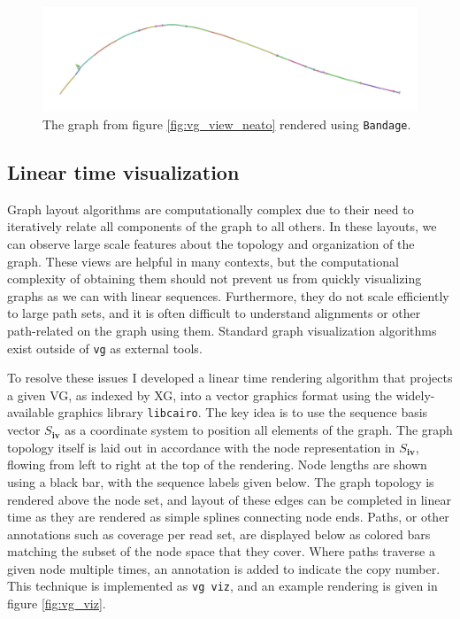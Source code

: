 \begin{figure}[htbp!] 
\centering    
\includegraphics[width=1.0\textwidth]{Chapter2/Figs/Vector/vg_view_H-3136_Bandage.pdf}
\caption[Force-directed layout with Bandage]{The graph from figure \ref{fig:vg_view_neato} rendered using {\tt Bandage}.}
\label{fig:vg_view_bandage}
\end{figure}

\subsection{Linear time visualization}

Graph layout algorithms are computationally complex due to their need to iteratively relate all components of the graph to all others.
In these layouts, we can observe large scale features about the topology and organization of the graph.
These views are helpful in many contexts, but the computational complexity of obtaining them should not prevent us from quickly visualizing graphs as we can with linear sequences.
Furthermore, they do not scale efficiently to large path sets, and it is often difficult to understand alignments or other path-related on the graph using them.
Standard graph visualization algorithms exist outside of {\tt vg} as external tools.

To resolve these issues I developed a linear time rendering algorithm that projects a given VG, as indexed by XG, into a vector graphics format using the widely-available graphics library {\tt libcairo}.
The key idea is to use the sequence basis vector $S_\textbf{iv}$ as a coordinate system to position all elements of the graph.
The graph topology itself is laid out in accordance with the node representation in $S_\textbf{iv}$, flowing from left to right at the top of the rendering.
Node lengths are shown using a black bar, with the sequence labels given below.
The graph topology is rendered above the node set, and layout of these edges can be completed in linear time as they are rendered as simple splines connecting node ends.
Paths, or other annotations such as coverage per read set, are displayed below as colored bars matching the subset of the node space that they cover.
Where paths traverse a given node multiple times, an annotation is added to indicate the copy number.
This technique is implemented as {\tt vg viz}, and an example rendering is given in figure \ref{fig:vg_viz}.

